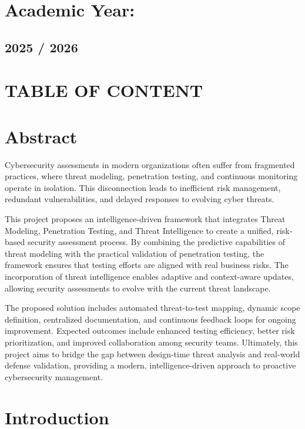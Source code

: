 \documentclass[12pt,a4paper]{report}
\begin{document}
\section{Academic Year:}

\subsection{2025 / 2026}

\section{TABLE OF CONTENT}

\section{Abstract}

Cybersecurity assessments in modern organizations often suffer from fragmented practices, where threat modeling, penetration testing, and continuous monitoring operate in isolation. This disconnection leads to inefficient risk management, redundant vulnerabilities, and delayed responses to evolving cyber threats.

This project proposes an intelligence-driven framework that integrates Threat Modeling, Penetration Testing, and Threat Intelligence to create a unified, risk-based security assessment process. By combining the predictive capabilities of threat modeling with the practical validation of penetration testing, the framework ensures that testing efforts are aligned with real business risks. The incorporation of threat intelligence enables adaptive and context-aware updates, allowing security assessments to evolve with the current threat landscape.

The proposed solution includes automated threat-to-test mapping, dynamic scope definition, centralized documentation, and continuous feedback loops for ongoing improvement. Expected outcomes include enhanced testing efficiency, better risk prioritization, and improved collaboration among security teams. Ultimately, this project aims to bridge the gap between design-time threat analysis and real-world defense validation, providing a modern, intelligence-driven approach to proactive cybersecurity management.

\section{Introduction}
\end{document}
